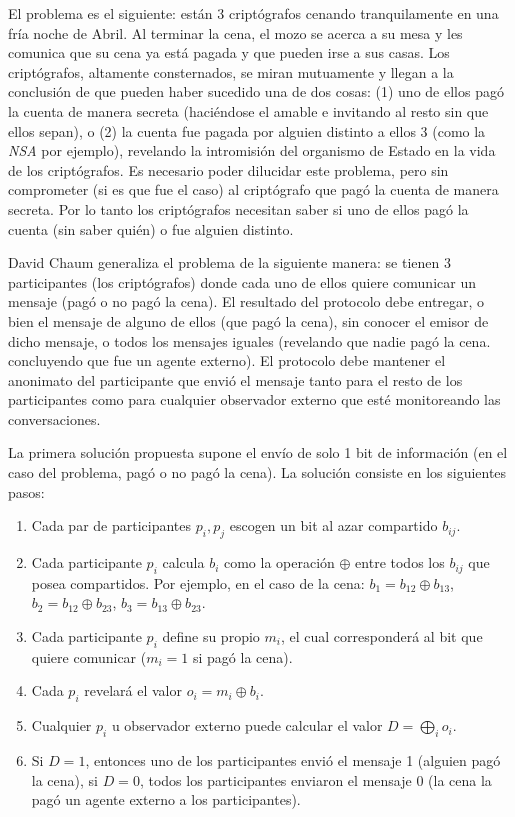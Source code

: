 El problema es el siguiente: están 3 criptógrafos cenando tranquilamente en una fría noche de Abril. Al terminar la cena, el mozo se acerca a su mesa y les comunica que su cena ya está pagada y que pueden irse a sus casas. Los criptógrafos, altamente consternados, se miran mutuamente y llegan a la conclusión de que pueden haber sucedido una de dos cosas: (1) uno de ellos pagó la cuenta de manera secreta (haciéndose el amable e invitando al resto sin que ellos sepan), o (2) la cuenta fue pagada por alguien distinto a ellos 3 (como la \emph{NSA} por ejemplo), revelando la intromisión del organismo de Estado en la vida de los criptógrafos. Es necesario poder dilucidar este problema, pero sin comprometer (si es que fue el caso) al criptógrafo que pagó la cuenta de manera secreta. Por lo tanto los criptógrafos necesitan saber si uno de ellos pagó la cuenta (sin saber quién) o fue alguien distinto.

David Chaum generaliza el problema de la siguiente manera: se tienen 3 participantes (los criptógrafos) donde cada uno de ellos quiere comunicar un mensaje (pagó o no pagó la cena). El resultado del protocolo debe entregar, o bien el mensaje de alguno de ellos (que pagó la cena),  sin conocer el emisor de dicho mensaje, o todos los mensajes iguales (revelando que nadie pagó la cena. concluyendo que fue un agente externo). El protocolo debe mantener el anonimato del participante que envió el mensaje tanto para el resto de los participantes como para cualquier observador externo que esté monitoreando las conversaciones.

La primera solución propuesta supone el envío de solo 1 bit de información (en el caso del problema, pagó o no pagó la cena). La solución consiste en los siguientes pasos:
\begin{enumerate}
    \item Cada par de participantes $p_i, p_j$ escogen un bit al azar compartido $b_{ij}$.
    \item Cada participante $p_i$ calcula $b_i$ como la operación $\oplus$ entre todos los $b_{ij}$ que posea compartidos. Por ejemplo, en el caso de la cena: $b_1 = b_{12} \oplus b_{13}$, $b_2 = b_{12} \oplus b_{23}$, $b_3 = b_{13} \oplus b_{23}$.
    \item Cada participante $p_i$ define su propio $m_i$, el cual corresponderá al bit que quiere comunicar ($m_i = 1$ si pagó la cena).
    \item Cada $p_i$ revelará el valor $o_i = m_i \oplus b_i$.
    \item Cualquier $p_i$ u observador externo puede calcular el valor $D = \displaystyle\bigoplus_i o_i$.
    \item Si $D = 1$, entonces uno de los participantes envió el mensaje 1 (alguien pagó la cena), si $D = 0$, todos los participantes enviaron el mensaje 0 (la cena la pagó un agente externo a los participantes).
\end{enumerate}


